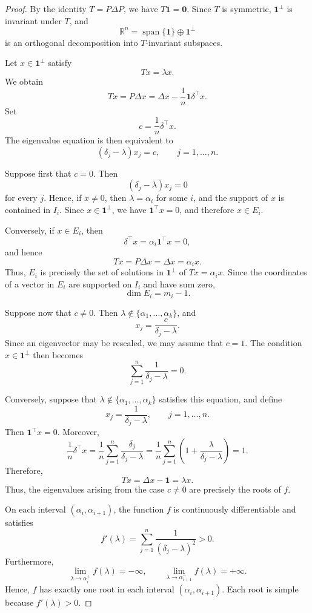 \documentclass[12pt,a4paper]{amsart}
\theoremstyle{remark}
\theoremstyle{definition}
\newcommand{\1}{\mathbf{1}}
\newcommand{\0}{\mathbf{0}}
\begin{document}
\begin{proof}
By the identity $T=P\Delta P$, we have
$T\mathbf{1}=\mathbf{0}$. Since $T$ is symmetric,
$\mathbf{1}^{\perp}$ is invariant under $T$, and
\[
\mathbb{R}^n
=
\operatorname{span}\{\mathbf{1}\}
\oplus
\mathbf{1}^{\perp}
\]
is an orthogonal decomposition into $T$-invariant subspaces.

Let $x\in\mathbf{1}^{\perp}$ satisfy
\[
Tx=\lambda x.
\]
We obtain
\[
Tx
=
P\Delta x
=
\Delta x-\frac{1}{n}\mathbf{1}\delta^{\top}x.
\]
Set
\[
c=\frac{1}{n}\delta^{\top}x.
\]
The eigenvalue equation is then equivalent to
\[
(\delta_j-\lambda)x_j=c,
\qquad
j=1,\ldots,n.
\]

Suppose first that $c=0$. Then
\[
(\delta_j-\lambda)x_j=0
\]
for every $j$. Hence, if $x\neq 0$, then $\lambda=\alpha_i$ for some
$i$, and the support of $x$ is contained in $I_i$. Since
$x\in\mathbf{1}^{\perp}$, we have
$\mathbf{1}^{\top}x=0$, and therefore $x\in E_i$.

Conversely, if $x\in E_i$, then
\[
\delta^{\top}x
=
\alpha_i\mathbf{1}^{\top}x
=
0,
\]
and hence
\[
Tx
=
P\Delta x
=
\Delta x
=
\alpha_i x.
\]
Thus, $E_i$ is precisely the set of solutions in
$\mathbf{1}^{\perp}$ of $Tx=\alpha_i x$. Since the coordinates of a
vector in $E_i$ are supported on $I_i$ and have sum zero,
\[
\dim E_i=m_i-1.
\]

Suppose now that $c\neq 0$. Then
$\lambda\notin\{\alpha_1,\ldots,\alpha_k\}$, and
\[
x_j=\frac{c}{\delta_j-\lambda}.
\]
Since an eigenvector may be rescaled, we may assume that $c=1$.
The condition $x\in\mathbf{1}^{\perp}$ then becomes
\[
\sum_{j=1}^{n}\frac{1}{\delta_j-\lambda}=0.
\]

Conversely, suppose that
$\lambda\notin\{\alpha_1,\ldots,\alpha_k\}$ satisfies this equation,
and define
\[
x_j=\frac{1}{\delta_j-\lambda},
\qquad
j=1,\ldots,n.
\]
Then $\mathbf{1}^{\top}x=0$. Moreover,
\[
\frac{1}{n}\delta^{\top}x
=
\frac{1}{n}
\sum_{j=1}^{n}\frac{\delta_j}{\delta_j-\lambda}
=
\frac{1}{n}
\sum_{j=1}^{n}
\left(
1+\frac{\lambda}{\delta_j-\lambda}
\right)
=
1.
\]
Therefore,
\[
Tx
=
\Delta x-\mathbf{1}
=
\lambda x.
\]
Thus, the eigenvalues arising from the case $c\neq 0$ are precisely the
roots of $f$.

On each interval $(\alpha_i,\alpha_{i+1})$, the function $f$ is
continuously differentiable and satisfies
\[
f'(\lambda)
=
\sum_{j=1}^{n}\frac{1}{(\delta_j-\lambda)^2}
>0.
\]
Furthermore,
\[
\lim_{\lambda\to\alpha_i^+}f(\lambda)=-\infty,
\qquad
\lim_{\lambda\to\alpha_{i+1}^-}f(\lambda)=+\infty.
\]
Hence, $f$ has exactly one root in each interval
$(\alpha_i,\alpha_{i+1})$. Each root is simple because
$f'(\lambda)>0$.


\end{proof}
\end{document}

